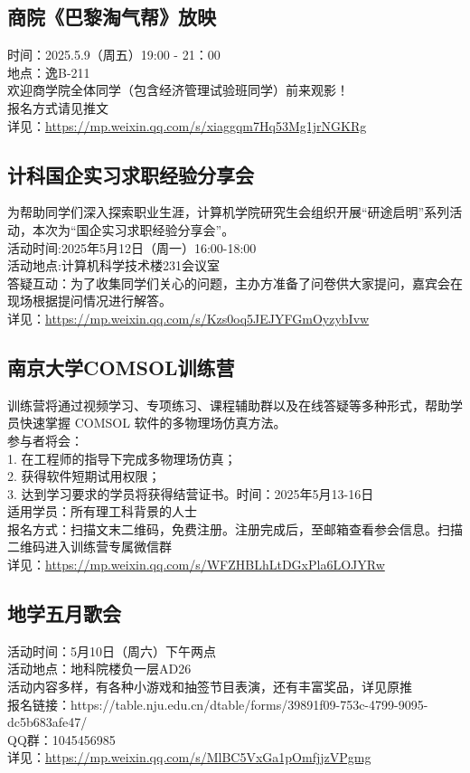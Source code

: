 \documentclass[letterpaper, 12pt]{article}
\begin{document}
\begin{multicols}{2}
\subsection{商院《巴黎淘气帮》放映} %
时间：2025.5.9（周五）19:00 - 21：00
\\地点：逸B-211
\\欢迎商学院全体同学（包含经济管理试验班同学）前来观影！
\\报名方式请见推文
\\详见：\url{https://mp.weixin.qq.com/s/xiaggqm7Hq53Mg1jrNGKRg}

\subsection{计科国企实习求职经验分享会} %
为帮助同学们深入探索职业生涯，计算机学院研究生会组织开展“研途启明”系列活动，本次为“国企实习求职经验分享会”。
\\活动时间:2025年5月12日（周一）16:00-18:00
\\活动地点:计算机科学技术楼231会议室
\\答疑互动：为了收集同学们关心的问题，主办方准备了问卷供大家提问，嘉宾会在现场根据提问情况进行解答。
\\详见：\url{https://mp.weixin.qq.com/s/Kzs0oq5JEJYFGmOyzybIvw}

\subsection{南京大学COMSOL训练营} %
训练营将通过视频学习、专项练习、课程辅助群以及在线答疑等多种形式，帮助学员快速掌握 COMSOL 软件的多物理场仿真方法。
\\参与者将会：
\\1. 在工程师的指导下完成多物理场仿真；
\\2. 获得软件短期试用权限；
\\3. 达到学习要求的学员将获得结营证书。时间：2025年5月13-16日
\\适用学员：所有理工科背景的人士
\\报名方式：扫描文末二维码，免费注册。注册完成后，至邮箱查看参会信息。扫描二维码进入训练营专属微信群
\\详见：\url{https://mp.weixin.qq.com/s/WFZHBLhLtDGxPla6LOJYRw}

\subsection{地学五月歌会} %
活动时间：5月10日（周六）下午两点
\\活动地点：地科院楼负一层AD26
\\活动内容多样，有各种小游戏和抽签节目表演，还有丰富奖品，详见原推
\\报名链接：https://table.nju.edu.cn/dtable/forms/39891f09-753c-4799-9095-dc5b683afe47/
\\QQ群：1045456985
\\详见：\url{https://mp.weixin.qq.com/s/MlBC5VxGa1pOmfjjzVPgmg}


\end{multicols}
\end{document}
